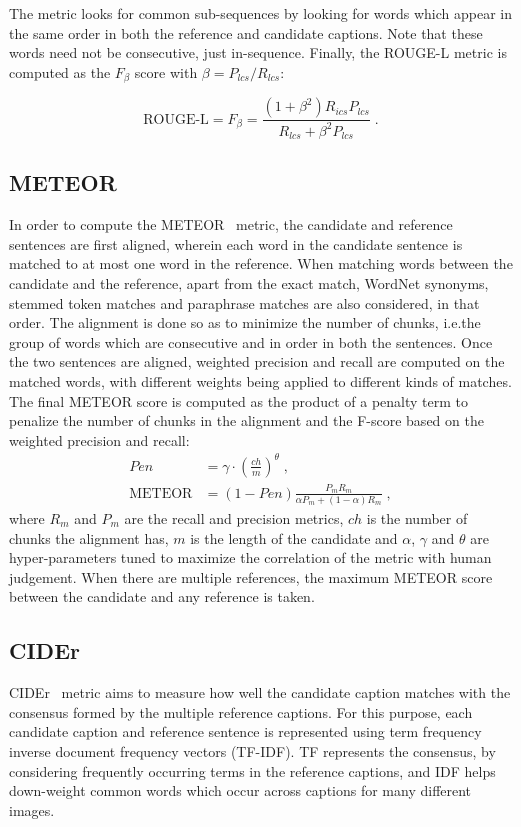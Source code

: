 The metric looks for common sub-sequences by looking for words which appear in the
same order in both the reference and candidate captions.
Note that these words need not be consecutive, just in-sequence.
Finally, the ROUGE-L metric is computed as the $F_\beta$ score with $\beta =
P_{lcs}/R_{lcs}$:

\begin{equation}
        \text{ROUGE-L} = F_{\beta} = \frac{(1+\beta^2)R_{ics}P_{lcs}}{R_{lcs}+ \beta^2 P_{lcs}} \; .
\end{equation}

\subsection{METEOR}
In order to compute the METEOR~\cite{denkowski-lavie:2014:Meteor} metric, the
candidate and reference sentences are first aligned, wherein each word in the
candidate sentence is matched to at most one word in the reference.
When matching words between the candidate and the reference, apart from the
exact match, WordNet synonyms, stemmed token matches and paraphrase matches are
also considered, in that order.
The alignment is done so as to minimize the number of chunks, i.e.\@ the group of
words which are consecutive and in order in both the sentences.
Once the two sentences are aligned, weighted precision and recall are computed
on the matched words, with different weights being applied to different kinds of
matches.
The final METEOR score is computed as the product of a penalty term to penalize the
number of chunks in the alignment and the F-score based on the weighted
precision and recall:
\begin{align}
        Pen &= \gamma\cdot\left(\frac{ch}{m}\right)^\theta \; ,\\[0.75ex]
        \text{METEOR} &= (1-Pen)\frac{P_m R_m}{\alpha{}P_m+(1-\alpha)R_m} \; ,
\end{align}
\noindent where $R_m$ and $P_m$ are the recall and precision metrics, $ch$ is
the number of chunks the alignment has, $m$ is the length of the candidate and
$\alpha$, $\gamma$ and $\theta$ are hyper-parameters tuned to maximize the
correlation of the metric with human judgement.
When there are multiple references, the maximum METEOR score between the
candidate and any reference is taken.

\subsection{CIDEr}
CIDEr~\cite{Vedantam_2015_CVPR} metric aims to measure how well the candidate
caption matches with the consensus formed by the multiple reference captions.
For this purpose, each candidate caption and reference sentence is represented
using term frequency inverse document frequency vectors (TF-IDF).
TF represents the consensus, by considering frequently occurring terms in
the reference captions, and IDF helps down-weight common words which occur across
captions for many different images.

